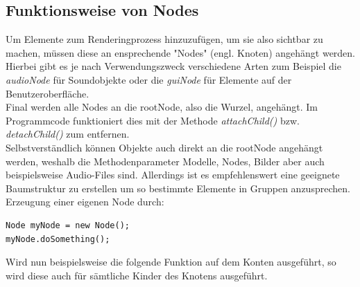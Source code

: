 \subsection{Funktionsweise von Nodes}
Um Elemente zum Renderingprozess hinzuzufügen, um sie also sichtbar zu machen, müssen diese an ensprechende "Nodes" (engl. Knoten) angehängt werden.
Hierbei gibt es je nach Verwendungszweck verschiedene Arten zum Beispiel die \emph{audioNode} für Soundobjekte oder die \emph{guiNode} für Elemente auf der Benutzeroberfläche.\\
Final werden alle Nodes an die rootNode, also die Wurzel, angehängt. Im  Programmcode funktioniert dies mit der Methode \emph{attachChild()} bzw. \emph{detachChild()} zum entfernen.\\
Selbstverständlich können Objekte auch direkt an die rootNode angehängt werden, weshalb die Methodenparameter Modelle, Nodes, Bilder aber auch beispielsweise Audio-Files sind.
Allerdings ist es empfehlenswert eine geeignete Baumstruktur zu erstellen um so bestimmte Elemente in Gruppen anzusprechen.\\ \underline{} Erzeugung einer eigenen Node durch:
\begin{lstlisting}
Node myNode = new Node();
myNode.doSomething();
\end{lstlisting}
Wird nun beispielsweise die folgende Funktion auf dem Konten ausgeführt, so wird diese auch für sämtliche Kinder des Knotens ausgeführt.





